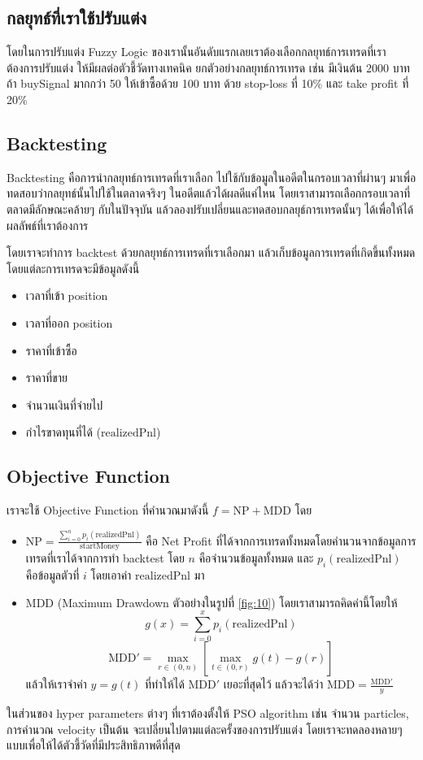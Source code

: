 \subsection{กลยุทธ์ที่เราใช้ปรับแต่ง}
โดยในการปรับแต่ง Fuzzy Logic ของเรานั้นอันดับแรกเลยเราต้องเลือกกลยุทธ์การเทรดที่เราต้องการปรับแต่ง ให้มีผลต่อตัวชี้วัดทางเทคนิค ยกตัวอย่างกลยุทธ์การเทรด
เช่น มีเงินต้น 2000 บาท ถ้า buySignal มากกว่า 50 ให้เข้าซื้อด้วย 100 บาท ด้วย stop-loss ที่ 10\% และ take profit ที่ 20\% 
\subsection{Backtesting}
Backtesting คือการนำกลยุทธ์การเทรดที่เราเลือก ไปใช้กับข้อมูลในอดีตในกรอบเวลาที่ผ่านๆ มาเพื่อทดสอบว่ากลยุทธ์นั้นไปใช้ในตลาดจริงๆ ในอดีตแล้วได้ผลดีแค่ไหน
โดยเราสามารถเลือกกรอบเวลาที่ตลาดมีลักษณะคล้ายๆ กับในปัจจุบัน แล้วลองปรับเปลี่ยนและทดสอบกลยุธ์การเทรดนั้นๆ ได้เพื่อให้ได้ผลลัพธ์ที่เราต้องการ

โดยเราจะทำการ backtest ด้วยกลยุทธ์การเทรดที่เราเลือกมา แล้วเก็บข้อมูลการเทรดที่เกิดขึ้นทั้งหมดโดยแต่ละการเทรดจะมีข้อมูลดังนี้ 
\begin{itemize}
    \item เวลาที่เข้า position
    \item เวลาที่ออก position
    \item ราคาที่เข้าซื้อ
    \item ราคาที่ขาย
    \item จำนวนเงินที่จ่ายไป
    \item กำไรขาดทุนที่ได้ ($\text{realizedPnl}$)
\end{itemize}

\subsection{Objective Function}
เราจะใช้ Objective Function ที่คำนวณมาดังนี้ $f = \text{NP} + \text{MDD}$ โดย
\begin{itemize}
    \item {$\text{NP} = \frac{\sum_{i=0}^{n} p_i(\text{realizedPnl})}{\text{startMoney}}$ 
        คือ Net Profit ที่ได้จากการเทรดทั้งหมดโดยคำนวนจากข้อมูลการเทรดที่เราได้จากการทำ backtest โดย $n$ คือจำนวนข้อมูลทั้งหมด
        และ $p_i(\text{realizedPnl})$ คือข้อมูลตัวที่ $i$ โดยเอาค่า $\text{realizedPnl}$ มา 
    }
    \item {$\text{MDD}$ (Maximum Drawdown ตัวอย่างในรูปที่ \ref{fig:10}) โดยเราสามารถคิดค่านี้โดยให้ 
    $$
        g(x) = \sum_{i = 0}^{x}p_i(\text{realizedPnl})
    $$
    \begin{equation}
        \text{MDD}' = \max_{r \in (0, n)} \left[ \max_{t \in (0, r)} g(t) - g(r) \right]
    \end{equation}
    แล้วให้เราจำค่า $y = g(t)$ ที่ทำให้ได้ 
    $\text{MDD}'$ เยอะที่สุดไว้ แล้วจะได้ว่า $\text{MDD} = \frac{\text{MDD}'}{y}$
    }
\end{itemize}
ในส่วนของ hyper parameters ต่างๆ ที่เราต้องตั้งให้ PSO algorithm เช่น จำนวน particles, การคำนวณ velocity เป็นต้น จะเปลี่ยนไปตามแต่ละครั้งของการปรับแต่ง 
โดยเราจะทดลองหลายๆ แบบเพื่อให้ได้ตัวชี้วัดที่มีประสิทธิภาพดีที่สุด

